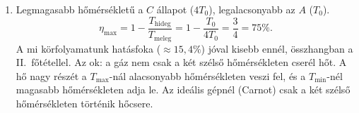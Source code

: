 \documentclass[11pt,a4paper]{article}
\begin{document}
\begin{enumerate}
\item Legmagasabb hőmérsékletű a $C$ állapot ($4T_0$), legalacsonyabb az $A$ ($T_0$).
  \[
    \eta_\text{max} = 1 - \frac{T_\text{hideg}}{T_\text{meleg}} = 1 - \frac{T_0}{4T_0}
    = \frac34 = 75\%.
  \]
  A mi körfolyamatunk hatásfoka ($\approx 15{,}4\%$) jóval kisebb ennél, összhangban a
  II.~főtétellel. Az ok: a gáz nem csak a két szélső hőmérsékleten cserél hőt. A hő
  nagy részét a $T_\text{max}$-nál alacsonyabb hőmérsékleten veszi fel, és a
  $T_\text{min}$-nél magasabb hőmérsékleten adja le. Az ideális gépnél (Carnot) csak
  a két szélső hőmérsékleten történik hőcsere.
\end{enumerate}
\end{document}
